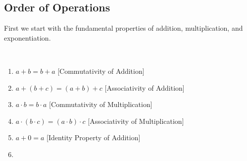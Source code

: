 \documentclass[crop=false,class=book,oneside]{standalone}
\begin{document}
        \subsection{Order of Operations}
            First we start with the fundamental properties of
            addition, multiplication, and exponentiation.
            \begin{properties}
                \label{property:North_Shore_Arithmetic_Properties}
                \
                \begin{enumerate}
                    \item
                        \label{%
                            property:%
                            North_Shore_Arithmetic_Properties_%
                            Com_Add%
                        }
                        $a+b=b+a$\hfill
                        [Commutativity of Addition]
                    \item
                        \label{
                            property:%
                            north_shore_arithmetic_properties_%
                            assoc_add%
                        }
                        $a+(b+c)=(a+b)+c$\hfill
                        [Associativity of Addition]
                    \item
                        \label{%
                            property:%
                            north_shore_arithmetic_properties_%
                            comm_mult%
                        }
                        ${a}\cdot{b}={b}\cdot{a}$\hfill
                        [Commutativity of Multiplication]
                    \item
                        \label{%
                            property:%
                            north_shore_arithmetic_properties_%
                            assoc_mult%
                        }
                        ${a}\cdot{({b}\cdot{c})}%
                         ={({a}\cdot{b})}\cdot{c}$\hfill
                        [Associativity of Multiplication]
                    \item
                        \label{%
                            property:%
                            north_shore_arithmetic_properties_%
                            add_identity
                        }
                        $a+0=a$\hfill%
                        [Identity Property of Addition]
                    \item
                        \label{%
                            property:%
}
\end{enumerate}
\end{properties}
\end{document}
